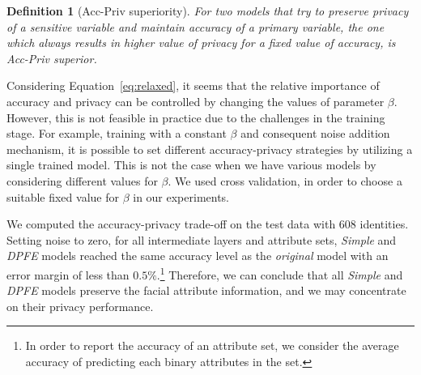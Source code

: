\documentclass[10pt,journal,compsoc]{IEEEtran}
\newtheorem{definition}[theorem]{Definition}
\begin{document}
\begin{definition}[Acc-Priv superiority] For two models that try to preserve privacy of a sensitive variable and maintain accuracy of a primary variable, the one which always results in higher value of privacy for a fixed value of accuracy, is \emph{Acc-Priv superior}.
\end{definition}

Considering Equation~\ref{eq:relaxed}, it seems that the relative importance of accuracy and privacy can be controlled by changing the values of parameter $\beta$. However, this is not feasible in practice due to the challenges in the training stage. For example, training with a constant $\beta$ and consequent noise addition mechanism, it is possible to set different accuracy-privacy strategies by utilizing a single trained model. This is not the case when we have various models by considering different values for $\beta$. We used cross validation, in order to choose a suitable fixed value for $\beta$ in our experiments. 

We computed the accuracy-privacy trade-off on the test data with 608 identities. Setting noise to zero, for all intermediate layers and attribute sets, \emph{Simple} and \emph{DPFE} models reached the same accuracy level as the \emph{original} model with an error margin of less than $0.5\%$.\footnote{In order to report the accuracy of an attribute set, we consider the average accuracy of predicting each binary attributes in the set.} Therefore, we can conclude that all \emph{Simple} and \emph{DPFE} models preserve the facial attribute information, and we may concentrate on their privacy performance. \\ 
\end{document}
